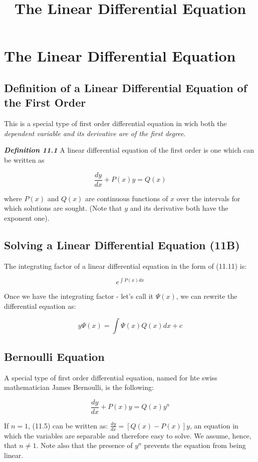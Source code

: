 \documentclass{article}
\title{The Linear Differential Equation}
\begin{document}
\section{The Linear Differential Equation}

\subsection{Definition of a Linear Differential Equation of the First Order}

This is a special type of first order differential equation in wich both the \emph{dependent variable and its derivative are of the first degree}.

\emph{\textbf{Definition 11.1}}
A linear differential equation of the first order is one which can be written as

\[ \tag{11.11} \frac{dy}{dx} + P(x)y = Q(x) \]

where $P(x)$ and $Q(x)$ are \@{continuous} functions of $x$ over the \@{intervals} for which solutions are sought. (Note that $y$ and its derivative both have the exponent one).

\subsection{Solving a Linear Differential Equation (11B)}

The integrating factor of a linear differential equation in the form of (11.11) is:

\[ \tag{11.12} e^{\int P(x)dx} \]

Once we have the integrating factor - let's call it $\Psi(x)$, we can rewrite the differential equation as:

\[ \tag{11.21} y\Psi(x) = \int\Psi(x)Q(x)dx + c \]

\subsection{Bernoulli Equation}
A special type of first order differential equation, named for hte swiss mathematician James Bernoulli, is the following:

\[ \tag{11.5} \frac{dy}{dx} + P(x)y = Q(x)y^n \]

If $n = 1$, (11.5) can be written as: $\frac{dy}{dx} = [Q(x) - P(x)]y$, an equation in which the variables are separable and therefore easy to solve. We assume, hence, that $n \neq 1$. Note also that the presence of $y^n$ prevents the equation from being linear.
\end{document}
